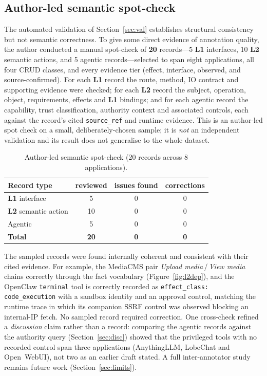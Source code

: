 \documentclass[11pt,a4paper]{article}
\newcommand{\cd}[1]{\lstinline[basicstyle=\ttfamily\small]|#1|}
\renewcommand{\L}[1]{\textbf{L#1}}
\begin{document}
\subsection{Author-led semantic spot-check}\label{sec:audit}
The automated validation of Section~\ref{sec:val} establishes structural consistency but not
semantic correctness. To give some direct evidence of annotation quality, the author conducted
a manual spot-check of \textbf{20} records---5 \L1 interfaces, 10 \L2 semantic actions, and 5
agentic records---selected to span eight applications, all four CRUD classes, and every
evidence tier (effect, interface, observed, and source-confirmed). For each \L1 record the
route, method, IO contract and supporting evidence were checked; for each \L2 record the
subject, operation, object, requirements, effects and \L1 bindings; and for each agentic
record the capability, trust classification, authority context and associated controls, each
against the record's cited \cd{source_ref} and runtime evidence. This is an author-led spot
check on a small, deliberately-chosen sample; it is \emph{not} an independent validation and
its result does not generalise to the whole dataset.

\begin{table}[ht]\centering\small
\caption{Author-led semantic spot-check (20 records across 8 applications).}\label{tab:audit}
\begin{tabular}{@{}lccc@{}}
\toprule
\textbf{Record type} & \textbf{reviewed} & \textbf{issues found} & \textbf{corrections}\\
\midrule
\L1 interface       &  5 & 0 & 0\\
\L2 semantic action & 10 & 0 & 0\\
Agentic             &  5 & 0 & 0\\
\midrule
\textbf{Total}      & \textbf{20} & \textbf{0} & \textbf{0}\\
\bottomrule
\end{tabular}
\end{table}

The sampled records were found internally coherent and consistent with their cited evidence.
For example, the MediaCMS pair \emph{Upload media}\,/\,\emph{View media} chains correctly
through the fact vocabulary (Figure~\ref{fig:l2dep}), and the OpenClaw \cd{terminal} tool is
correctly recorded as \cd{effect_class: code_execution} with a sandbox identity and an approval
control, matching the runtime trace in which its companion SSRF control was observed blocking an
internal-IP fetch. No sampled record required correction. One cross-check refined a
\emph{discussion} claim rather than a record: comparing the agentic records against the
authority query (Section~\ref{sec:disc}) showed that the privileged tools with no recorded
control span three applications (AnythingLLM, LobeChat and Open~WebUI), not two as an earlier
draft stated. A full inter-annotator study remains future work (Section~\ref{sec:limits}).
\end{document}
